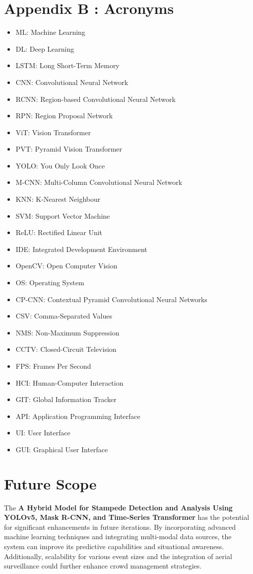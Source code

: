\documentclass[11pt]{report}
\begin{document}
\chapter{Appendix B : Acronyms}
  \begin{itemize}
        \item ML: Machine Learning
        \item DL: Deep Learning
        \item LSTM: Long Short-Term Memory
        \item CNN: Convolutional Neural Network
        \item RCNN: Region-based Convolutional Neural Network
        \item RPN: Region Proposal Network  
        \item ViT: Vision Transformer  
        \item PVT: Pyramid Vision Transformer  
        \item YOLO: You Only Look Once  
        \item M-CNN:  Multi-Column Convolutional Neural Network 
        \item KNN: K-Nearest Neighbour 
        \item SVM: Support Vector Machine 
        \item ReLU: Rectified Linear Unit  
        \item IDE: Integrated Development Environment 
        \item OpenCV: Open Computer Vision 
        \item OS: Operating System 
        \item CP-CNN: Contextual Pyramid Convolutional Neural Networks
        \item CSV: Comma-Separated Values  
        \item NMS: Non-Maximum Suppression  
        \item CCTV: Closed-Circuit Television  
        \item FPS: Frames Per Second  
        \item HCI: Human-Computer Interaction  
        \item GIT: Global Information Tracker  
        \item API: Application Programming Interface  
        \item UI: User Interface  
        \item GUI: Graphical User Interface  
\end{itemize}
 
\chapter{Future Scope}
The \textbf{A Hybrid Model for Stampede Detection and Analysis Using YOLOv5, Mask R-CNN, and Time-Series Transformer} has the potential for significant enhancements in future iterations. By incorporating advanced machine learning techniques and integrating multi-modal data sources, the system can improve its predictive capabilities and situational awareness. Additionally, scalability for various event sizes and the integration of aerial surveillance could further enhance crowd management strategies.
\end{document}
